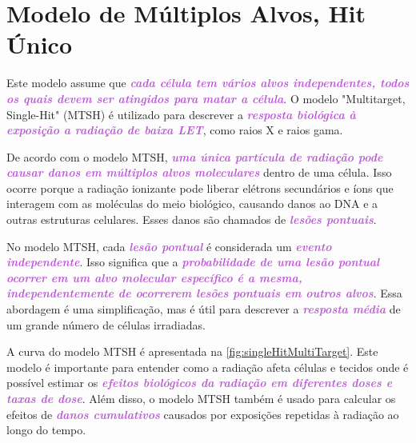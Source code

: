 \documentclass[11pt,a4paper]{article}
\begin{document}
\section{Modelo de Múltiplos Alvos, Hit Único}

	Este modelo assume que \textcolor{MediumOrchid}{\textbf{\textit{cada célula tem vários alvos independentes, todos os quais devem ser atingidos para matar a célula}}}. O modelo "Multitarget, Single-Hit" (MTSH) é utilizado para descrever a \textcolor{MediumOrchid}{\textbf{\textit{resposta biológica à exposição a radiação de baixa LET}}}, como raios X e raios gama.

	De acordo com o modelo MTSH, \textcolor{MediumOrchid}{\textbf{\textit{uma única partícula de radiação pode causar danos em múltiplos alvos moleculares}}} dentro de uma célula. Isso ocorre porque a radiação ionizante pode liberar elétrons secundários e íons que interagem com as moléculas do meio biológico, causando danos ao DNA e a outras estruturas celulares. Esses danos são chamados de \textcolor{MediumOrchid}{\textbf{\textit{lesões pontuais}}}.  

	No modelo MTSH, cada \textcolor{MediumOrchid}{\textbf{\textit{lesão pontual}}} é considerada um \textcolor{MediumOrchid}{\textbf{\textit{evento independente}}}. Isso significa que a \textcolor{MediumOrchid}{\textbf{\textit{probabilidade de uma lesão pontual ocorrer em um alvo molecular específico é a mesma, independentemente de ocorrerem lesões pontuais em outros alvos}}}. Essa abordagem é uma simplificação, mas é útil para descrever a \textcolor{MediumOrchid}{\textbf{\textit{resposta média}}} de um grande número de células irradiadas.

	A curva do modelo MTSH é apresentada na \ref{fig:singleHitMultiTarget}. Este modelo é importante para entender como a radiação afeta células e tecidos onde é possível estimar os \textcolor{MediumOrchid}{\textbf{\textit{efeitos biológicos da radiação em diferentes doses e taxas de dose}}}. Além disso, o modelo MTSH também é usado para calcular os efeitos de \textcolor{MediumOrchid}{\textbf{\textit{danos cumulativos}}} causados por exposições repetidas à radiação ao longo do tempo.
\end{document}
